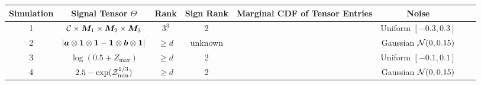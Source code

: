 \documentclass[10pt]{article}
\begin{document}
\renewcommand{\arraystretch}{1}

\begin{table}
\begin{tabular}{c|ccccccc}
Simulation &Signal Tensor $\Theta$ & Rank&  Sign Rank  & Marginal CDF of Tensor Entries & Noise  \\
\hline
1&$\mathcal{C}\times\bm M_1\times\bm M_2\times\bm M_3$ &$3^3$&2 & \multirow{4}{*}{
}
 &
Uniform $[-0.3,0.3]$\\
  \rowcolor{lightgray}
2& $|\bm{a}\otimes \mathbf{1}\otimes\mathbf{1}-\mathbf{1}\otimes\bm{b}\otimes \mathbf{1}|$& $\geq d$&unknown&&
Gaussian $\mathcal{N}(0,0.15)$\\
3& $\log(0.5+Z_{\max})$&$\geq d$& 2&&
Uniform $[-0.1,0.1]$\\
 \rowcolor{lightgray}
4& $2.5-\exp(\mathcal{Z}^{1/3}_{\min})$& $\geq d$ & 2 & &
Gaussian $\mathcal{N}(0,0.15)$
\end{tabular}
\end{table}
\end{document}
